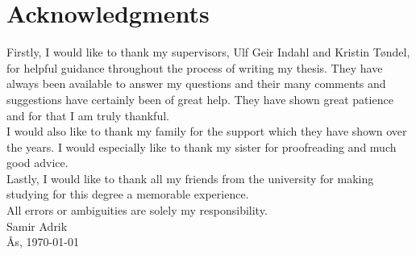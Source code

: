 \documentclass[../thesis.tex]{subfiles}
\begin{document}
\chapter*{Acknowledgments}

\noindent Firstly, I would like to thank my supervisors, Ulf Geir Indahl and Kristin Tøndel, for helpful guidance throughout the process of writing my thesis. They have always been available to answer my questions and their many comments and suggestions have certainly been of great help. They have shown great patience and for that I am truly thankful.\\

\noindent I would also like to thank my family for the support which they have shown over the years. I would especially like to thank my sister for proofreading and much good advice.\\

\noindent Lastly, I would like to thank all my friends from the university for making studying for this degree a memorable experience. \\

\noindent All errors or ambiguities are solely my responsibility.\\

\noindent Samir Adrik\\
Ås, \today

\newpage{\pagestyle{empty}\cleardoublepage}
\end{document}
